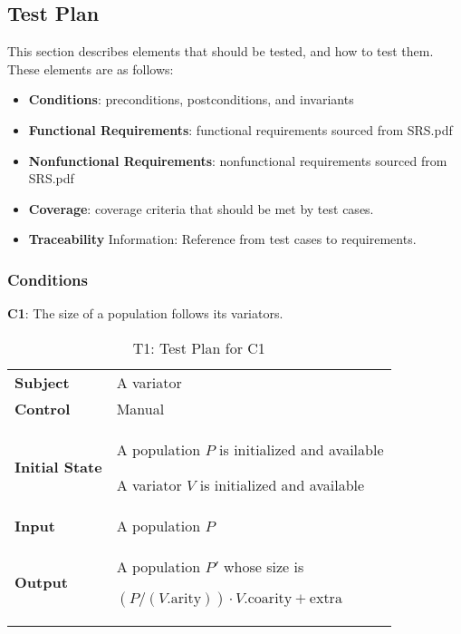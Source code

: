 \documentclass[12pt, titlepage]{article}
\begin{document}
\subsection{Test Plan}
This section describes elements that should be tested, and how to test them. These elements are as follows:
\begin{itemize}
  \item \textbf{Conditions}: preconditions, postconditions, and invariants
  \item \textbf{Functional Requirements}: functional requirements sourced from SRS.pdf
  \item \textbf{Nonfunctional Requirements}: nonfunctional requirements sourced from SRS.pdf
  \item \textbf{Coverage}: coverage criteria that should be met by test cases.
  \item \textbf{Traceability} Information: Reference from test cases to requirements.
\end{itemize}

\subsubsection{Conditions}
\textbf{C1}: The size of a population follows its variators.

\begin{table}[!ht]
  \caption{T1: Test Plan for C1}
  \label{table:t1}
  \begin{tabularx}{\textwidth}{p{3cm}X}
    \toprule
    {\bf Subject} & A variator\\
    {\bf Control} & Manual\\
    {\bf Initial State} & A population $P$ is initialized and available

    A variator $V$ is initialized and available\\
    {\bf Input} & A population $P$\\
    {\bf Output} & A population $P'$ whose size is

    $(P/(V.\mathrm{arity}))\cdot V.\mathrm{coarity}+\mathrm{extra}$\\

    \bottomrule
  \end{tabularx}
\end{table}
\end{document}
